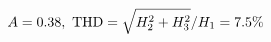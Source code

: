 \documentclass[preview]{standalone}
\begin{document}
\begin{align*}
\special{dvisvgm:raw <g id='unique000'>}A=0.38,\ \text{THD}=\sqrt{H_2^2+H_3^2}/H_1=7.5\%\special{dvisvgm:raw </g>}
\end{align*}
\end{document}
